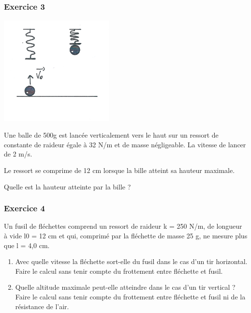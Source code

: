 \begin{multicols}{2}
\subsubsection[Exercice 3]{Exercice 3}
\begin{center}
\begin{minipage}{6.276cm}
 \includegraphics[width=5.75cm,height=5.539cm]{COURS2EnergieOHEXERCRESOL-img/COURS2EnergieOHEXERCRESOL-img004.png} 
\end{minipage}
\end{center}
Une balle de 500g est lancée verticalement vers le haut sur un ressort de constante de raideur égale à 32 N/m et de
masse négligeable. La vitesse de lancer de 2 m/s.

Le ressort se comprime de 12 cm lorsque la bille atteint sa hauteur maximale.

Quelle est la hauteur atteinte par la bille ? 

\subsubsection{Exercice 4}
Un fusil de fléchettes comprend un ressort de raideur k = 250 N/m, de longueur à vide l0 = 12 cm et qui, comprimé par la
fléchette de masse 25 g, ne mesure plus que l = 4,0 cm.

\begin{enumerate}
\item Avec quelle vitesse la fléchette sort-elle du fusil dans le cas d’un tir horizontal. Faire le calcul sans tenir
compte du frottement entre fléchette et fusil.
\item Quelle altitude maximale peut-elle atteindre dans le cas d’un tir vertical ? Faire le calcul sans tenir compte du
frottement entre fléchette et fusil ni de la résistance de l’air.

\end{enumerate}

\end{multicols}
